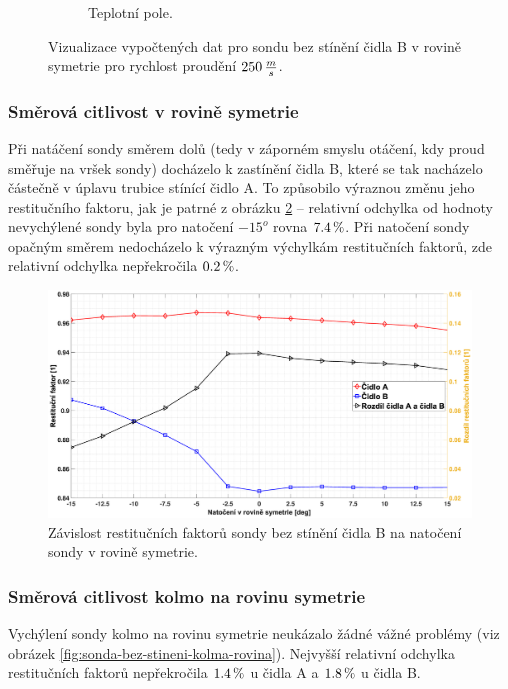 \begin{figure}[ht!]
\begin{subfigure}{0.45\textwidth}
                    \caption{Teplotní pole.}
                \end{subfigure}
                \caption{Vizualizace vypočtených dat pro sondu bez stínění čidla B v rovině symetrie pro rychlost proudění $250 \, \frac{m}{s}$.}
                \label{fig:sonda-bez-stineni-vizualizace}
            \end{figure}


        \newpage
        \subsubsection{Směrová citlivost v rovině symetrie}
            Při natáčení sondy směrem dolů (tedy v záporném smyslu otáčení, kdy proud směřuje na vršek sondy) docházelo k zastínění čidla B, které se tak nacházelo částečně v úplavu trubice stínící čidlo A. To způsobilo výraznou změnu jeho restitučního faktoru, jak je patrné z obrázku \ref{fig:sonda-bez-stineni-rovina-symetrie} – relativní odchylka od hodnoty nevychýlené sondy byla pro natočení $-15^o$ rovna $7.4 \, \%$. Při natočení sondy opačným směrem nedocházelo k výrazným výchylkám restitučních faktorů, zde relativní odchylka nepřekročila $0.2 \, \%$.
            
            \begin{figure}[ht!]
                \centering
                \includegraphics*[width=\textwidth, trim={5.9cm 1.0cm 2.7cm 2.0cm}]{400_SIMULACE_KONSTRUKCNICH_UPRAV/Grafy/01_rovina_symetrie}
                \caption{Závislost restitučních faktorů sondy bez stínění čidla B na natočení sondy v rovině symetrie.}
                \label{fig:sonda-bez-stineni-rovina-symetrie}
            \end{figure}
        \subsubsection{Směrová citlivost kolmo na rovinu symetrie}
            Vychýlení sondy kolmo na rovinu symetrie neukázalo žádné vážné problémy (viz obrázek \ref{fig:sonda-bez-stineni-kolma-rovina}). Nejvyšší relativní odchylka restitučních faktorů nepřekročila $1.4 \, \%$ u čidla A a $1.8 \, \%$ u čidla B.
            
